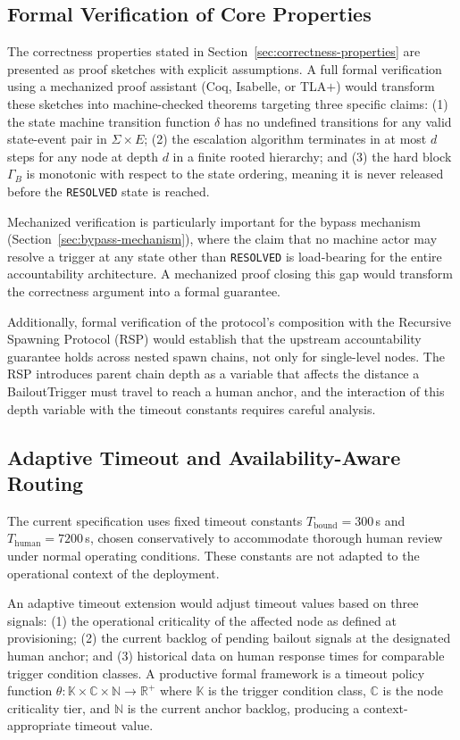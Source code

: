 \subsection{Formal Verification of Core Properties}
\label{sec:formal-verification}

The correctness properties stated in Section~\ref{sec:correctness-properties} are presented as proof sketches with explicit assumptions. A full formal verification using a mechanized proof assistant (Coq, Isabelle, or TLA$+$) would transform these sketches into machine-checked theorems targeting three specific claims: (1) the state machine transition function $\delta$ has no undefined transitions for any valid state-event pair in $\Sigma \times E$; (2) the escalation algorithm terminates in at most $d$ steps for any node at depth $d$ in a finite rooted hierarchy; and (3) the hard block $\Gamma_B$ is monotonic with respect to the state ordering, meaning it is never released before the \texttt{RESOLVED} state is reached.

Mechanized verification is particularly important for the bypass mechanism (Section~\ref{sec:bypass-mechanism}), where the claim that no machine actor may resolve a trigger at any state other than \texttt{RESOLVED} is load-bearing for the entire accountability architecture. A mechanized proof closing this gap would transform the correctness argument into a formal guarantee.

Additionally, formal verification of the protocol's composition with the Recursive Spawning Protocol (RSP) would establish that the upstream accountability guarantee holds across nested spawn chains, not only for single-level nodes. The RSP introduces parent chain depth as a variable that affects the distance a BailoutTrigger must travel to reach a human anchor, and the interaction of this depth variable with the timeout constants requires careful analysis.

\subsection{Adaptive Timeout and Availability-Aware Routing}
\label{sec:adaptive-timeout}

The current specification uses fixed timeout constants $T_{\text{bound}}=300$\,s and $T_{\text{human}}=7200$\,s, chosen conservatively to accommodate thorough human review under normal operating conditions. These constants are not adapted to the operational context of the deployment.

An adaptive timeout extension would adjust timeout values based on three signals: (1) the operational criticality of the affected node as defined at provisioning; (2) the current backlog of pending bailout signals at the designated human anchor; and (3) historical data on human response times for comparable trigger condition classes. A productive formal framework is a timeout policy function $\theta : \mathbb{K} \times \mathbb{C} \times \mathbb{N} \rightarrow \mathbb{R}^+$ where $\mathbb{K}$ is the trigger condition class, $\mathbb{C}$ is the node criticality tier, and $\mathbb{N}$ is the current anchor backlog, producing a context-appropriate timeout value.


